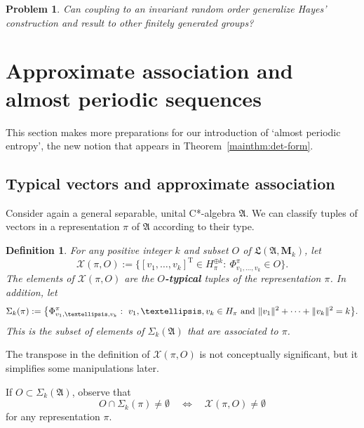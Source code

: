 \documentclass[12pt,a4paper]{article}
\numberwithin{equation}{section}
\newtheorem{dfn}[thm]{Definition}
\newtheorem{prob}[thm]{Problem}
\theoremstyle{remark}
\renewcommand{\rm}[1]{\mathrm{#1}}
\newcommand{\rmM}{\mathbf{M}}
\newcommand{\X}{\mathcal{X}}
\newcommand{\A}{\mathfrak{A}}
\newcommand{\frL}{\mathfrak{L}}
\renewcommand{\S}{\Sigma}
\begin{document}
\begin{prob}
Can coupling to an invariant random order generalize Hayes' construction and result to other finitely generated groups?
\end{prob}




























\section{Approximate association and almost periodic sequences}\label{sec:approx-assoc}

This section makes more preparations for our introduction of `almost periodic entropy', the new notion that appears in Theorem~\ref{mainthm:det-form}.

\subsection{Typical vectors and approximate association}\label{subs:typ-vec}

Consider again a general separable, unital C*-algebra $\A$. We can classify tuples of vectors in a representation $\pi$ of $\A$ according to their type.

\begin{dfn}\label{dfn:typical}
For any positive integer $k$ and subset $O$ of $\frL(\A,\rmM_k)$, let
\[ \X(\pi,O) := \big\{[v_1,\dots,v_k]^\rm{T} \in H_\pi^{\oplus k} :\ \Phi^\pi_{v_1,\dots,v_k} \in O \big\}. \]
The elements of $\X(\pi,O)$ are the \textbf{$O$-typical} tuples of the representation $\pi$.  In addition, let
\[\S_k(\pi) := \big\{\Phi^\pi_{v_1,\dots,v_k}:\ v_1,\dots,v_k \in H_\pi\ \hbox{and}\ \|v_1\|^2 + \cdots + \|v_k\|^2 = k\big\}.\]
This is the subset of elements of $\S_k(\A)$ that are associated to $\pi$.
\end{dfn}

The transpose in the definition of $\X(\pi,O)$ is not conceptually significant, but it simplifies some manipulations later.

If $O \subset \S_k(\A)$, observe that
\begin{equation}\label{eq:meet-and-nonempty}
O\cap \S_k(\pi) \ne \emptyset \quad \Leftrightarrow \quad \X(\pi,O) \ne \emptyset
\end{equation}
for any representation $\pi$.
\end{document}
